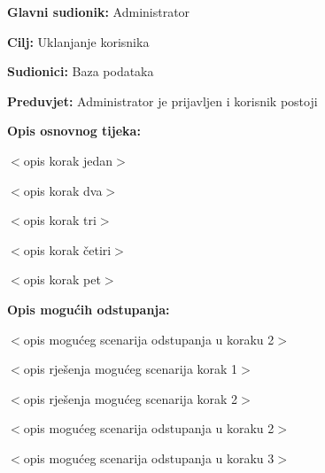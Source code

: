 					\noindent {}
					\begin{packed_item}
	
						\item \textbf{Glavni sudionik:} Administrator
						\item  \textbf{Cilj:} Uklanjanje korisnika
						\item  \textbf{Sudionici:} Baza podataka
						\item  \textbf{Preduvjet:} Administrator je prijavljen i korisnik postoji
						\item  \textbf{Opis osnovnog tijeka:}
						
						\item[] \begin{packed_enum}
	
							\item $<$opis korak jedan$>$
							\item $<$opis korak dva$>$
							\item $<$opis korak tri$>$
							\item $<$opis korak četiri$>$
							\item $<$opis korak pet$>$
						\end{packed_enum}
						
						\item  \textbf{Opis mogućih odstupanja:}
						
						\item[] \begin{packed_item}
	
							\item[2.a] $<$opis mogućeg scenarija odstupanja u koraku 2$>$
							\item[] \begin{packed_enum}
								
								\item $<$opis rješenja mogućeg scenarija korak 1$>$
								\item $<$opis rješenja mogućeg scenarija korak 2$>$
								
							\end{packed_enum}
							\item[2.b] $<$opis mogućeg scenarija odstupanja u koraku 2$>$
							\item[3.a] $<$opis mogućeg scenarija odstupanja  u koraku 3$>$
							
						\end{packed_item}
					\end{packed_item}
				
